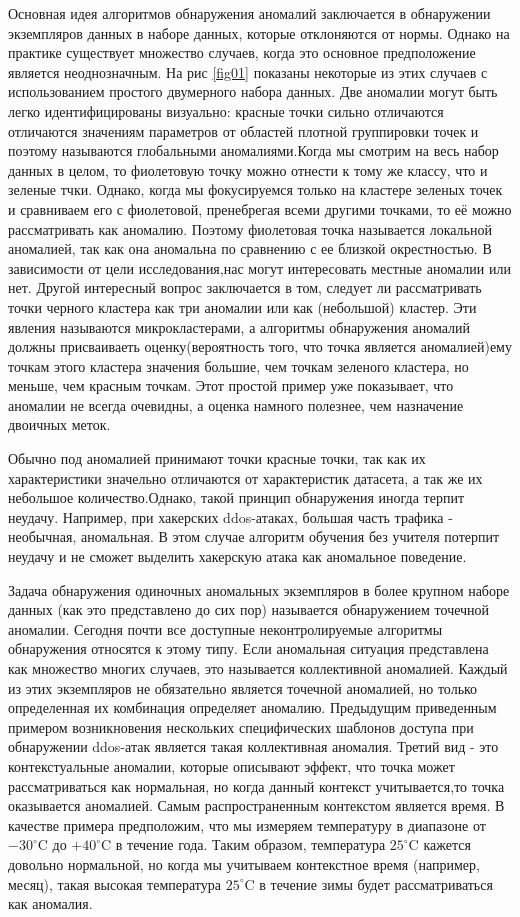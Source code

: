 Основная идея алгоритмов обнаружения аномалий заключается в обнаружении экземпляров данных в наборе данных, которые отклоняются от нормы. Однако на практике существует множество случаев, когда это основное предположение является неоднозначным. На рис \ref{fig01} показаны некоторые из этих случаев с использованием простого двумерного набора данных. Две аномалии могут быть легко идентифицированы визуально: красные точки  сильно отличаются отличаются значениям параметров от областей плотной группировки точек  и поэтому называются глобальными аномалиями.Когда мы смотрим на весь набор данных в целом, то фиолетовую точку можно отнести к тому же классу, что и зеленые тчки.  Однако, когда мы фокусируемся только на кластере зеленых точек и сравниваем его с фиолетовой, пренебрегая всеми другими точками, то её можно рассматривать как аномалию. Поэтому фиолетовая точка называется локальной аномалией, так как она аномальна по сравнению с ее близкой окрестностью. В зависимости от цели исследования,нас могут интересовать   местные аномалии или нет. Другой интересный вопрос заключается в том, следует ли рассматривать точки черного кластера  как три аномалии или как (небольшой) кластер. Эти явления называются микрокластерами, а алгоритмы обнаружения аномалий должны присваиваеть  оценку(вероятность того, что точка является аномалией)ему точкам этого кластера значения большие, чем точкам зеленого кластера, но меньше, чем красным точкам. Этот простой пример уже показывает, что аномалии не всегда очевидны, а оценка намного полезнее, чем назначение двоичных меток.

Обычно под аномалией принимают точки красные точки, так как их характеристики значельно отличаются от характеристик датасета, а так же их небольшое количество.Однако, такой принцип обнаружения иногда терпит неудачу. Например, при хакерских ddos-атаках, большая часть трафика - необычная, аномальная. В этом случае алгоритм обучения без учителя потерпит неудачу и не сможет выделить хакерскую атака как аномальное поведение.

Задача обнаружения одиночных аномальных экземпляров в более крупном наборе данных (как это представлено до сих пор) называется обнаружением точечной аномалии\cite{Book04}. Сегодня почти все доступные неконтролируемые алгоритмы обнаружения  относятся к этому типу. Если аномальная ситуация представлена ​​как множество многих случаев, это называется коллективной аномалией. Каждый из этих экземпляров не обязательно является точечной аномалией, но только определенная их комбинация определяет аномалию. Предыдущим приведенным примером возникновения нескольких специфических шаблонов доступа при обнаружении ddos-атак является такая коллективная аномалия. Третий вид - это контекстуальные аномалии, которые описывают эффект, что точка может рассматриваться как нормальная, но когда данный контекст учитывается,то точка оказывается аномалией. Самым распространенным контекстом является время. В качестве примера предположим, что мы измеряем температуру в диапазоне от $-30^{\circ}$C до $+40^{\circ}$C в течение года. Таким образом, температура $25^{\circ}$C кажется довольно нормальной, но когда мы учитываем контекстное время (например, месяц), такая высокая температура $25^{\circ}$C  в течение зимы  будет рассматриваться как аномалия.

